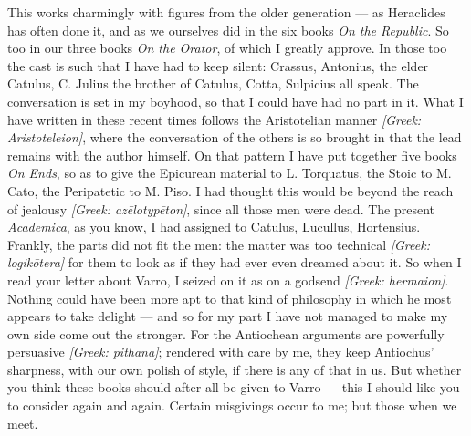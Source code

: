  This works charmingly with figures from the older generation --- as Heraclides has often done it, and as we ourselves did in the six books \textit{On the Republic}. So too in our three books \textit{On the Orator}, of which I greatly approve. In those too the cast is such that I have had to keep silent: Crassus, Antonius, the elder Catulus, C. Julius the brother of Catulus, Cotta, Sulpicius all speak. The conversation is set in my boyhood, so that I could have had no part in it. What I have written in these recent times follows the Aristotelian manner \textit{[Greek: Aristoteleion]}, where the conversation of the others is so brought in that the lead remains with the author himself. On that pattern I have put together five books \textit{On Ends}, so as to give the Epicurean material to L. Torquatus, the Stoic to M. Cato, the Peripatetic to M. Piso. I had thought this would be beyond the reach of jealousy \textit{[Greek: az\=elotyp\=eton]}, since all those men were dead. The present \textit{Academica}, as you know, I had assigned to Catulus, Lucullus, Hortensius. Frankly, the parts did not fit the men: the matter was too technical \textit{[Greek: logik\=otera]} for them to look as if they had ever even dreamed about it. So when I read your letter about Varro, I seized on it as on a godsend \textit{[Greek: hermaion]}. Nothing could have been more apt to that kind of philosophy in which he most appears to take delight --- and so for my part I have not managed to make my own side come out the stronger. For the Antiochean arguments are powerfully persuasive \textit{[Greek: pithana]}; rendered with care by me, they keep Antiochus' sharpness, with our own polish of style, if there is any of that in us. But whether you think these books should after all be given to Varro --- this I should like you to consider again and again. Certain misgivings occur to me; but those when we meet.

